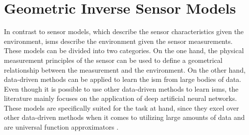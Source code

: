 \section{Geometric Inverse Sensor Models}
\label{sec:geo_ism}
In contrast to sensor models, which describe the sensor characteristics given the environment, \gls{ism}s describe the environment given the sensor measurements. These models can be divided into two categories. On the one hand, the physical measurement principles of the sensor can be used to define a geometrical relationship between the measurement and the environment. On the other hand, data-driven methods can be applied to learn the \gls{ism} from large bodies of data. Even though it is possible to use other data-driven methods to learn \gls{ism}s, the literature mainly focuses on the application of deep artificial neural networks. These models are specifically suited for the task at hand, since they excel over other data-driven methods when it comes to utilizing large amounts of data \cite{zhou2014big} and are universal function approximators \cite{hornik1991approximation}.
%
